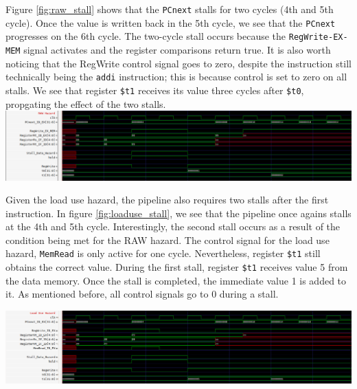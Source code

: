 \documentclass[twocolumn]{article}
\newcommand{\cc}[1]{\texttt{#1}}
\begin{document}
Figure \ref{fig:raw_stall} shows that the \cc{PCnext} stalls for two cycles (4th and 5th cycle). Once the value is written back in the 5th cycle, we see that the \cc{PCnext} progresses on the 6th cycle. The two-cycle stall occurs because the \cc{RegWrite-EX-MEM} signal activates and the register comparisons return true. It is also worth noticing that the RegWrite control signal goes to zero, despite the instruction still technically being the \cc{addi} instruction; this is because control is set to zero on all stalls. We see that register \cc{\$t1} receives its value three cycles after \cc{\$t0}, propgating the effect of the two stalls. \\ 

\begingroup
    \centering
    \medskip
    \includegraphics[width=\columnwidth]{Lab-Tex/Lab7-images/p3.png}
    \label{fig:raw_stall}
    \medskip
\endgroup

Given the load use hazard, the pipeline also requires two stalls after the first instruction. In figure \ref{fig:loaduse_stall}, we see that the pipeline once agains stalls at the 4th and 5th cycle. Interestingly, the second stall occurs as a result of the condition being met for the RAW hazard. The control signal for the load use hazard, \cc{MemRead} is only active for one cycle. Nevertheless, register \cc{\$t1} still obtains the correct value. During the first stall, register \cc{\$t1} receives value 5 from the data memory. Once the stall is completed, the immediate value 1 is added to it. As mentioned before, all control signals go to 0 during a stall. 

\begingroup
    \centering
    \medskip
    \includegraphics[width=\columnwidth]{Lab-Tex/Lab7-images/p4.png}
    \label{fig:loaduse_stall}
    \medskip
\endgroup
\end{document}
